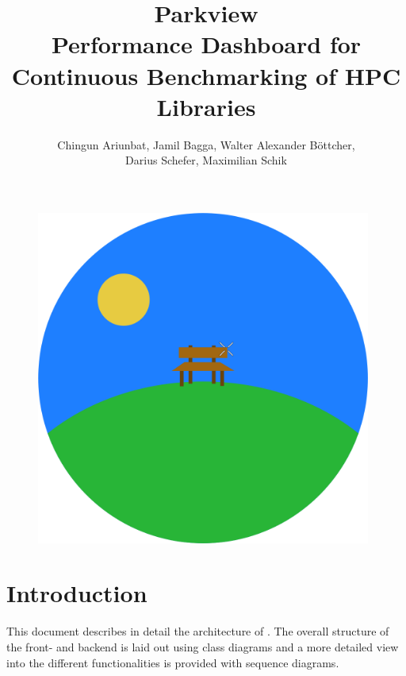 \documentclass[parskip=full,11pt]{scrartcl}
\title{\Huge Parkview\\
    \LARGE \normalfont Performance Dashboard for Continuous Benchmarking of HPC Libraries}
\author{Chingun Ariunbat, Jamil Bagga, Walter Alexander B\"ottcher,\\Darius Schefer, Maximilian Schik}
\begin{document}
\maketitle
\begin{figure}[h]
	\includegraphics[width=11cm]{parkview.png}
	\centering
\end{figure}

\thispagestyle{empty}

\clearpage
{}

\tableofcontents
\clearpage

\section{Introduction}
This document describes in detail the architecture of \parkview{}. The overall structure of the front- and backend is laid out using class diagrams and a more detailed view into the different functionalities is provided with sequence diagrams.
\clearpage


\clearpage


\clearpage


\clearpage


\clearpage


\appendix


\clearpage
\end{document}
